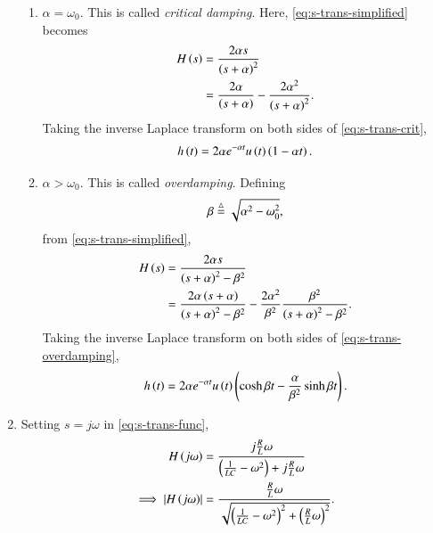 \documentclass[journal,12pt,twocolumn]{IEEEtran}
\begin{document}
\begin{enumerate}[label=\theenumi.]
\begin{enumerate}
        \item \(\alpha = \omega_0\). This is called \emph{critical damping}.
        Here, \eqref{eq:s-trans-simplified} becomes
        \begin{align}
            H\left(s\right) &= \frac{2\alpha{}s}{\left(s+\alpha\right)^2} \label{eq:H-s-crit} \\
                      &= \frac{2\alpha}{\left(s+\alpha\right)} - \frac{2\alpha^2}{\left(s+\alpha\right)^2}.
            \label{eq:s-trans-crit}
        \end{align}
        Taking the inverse Laplace transform on both sides of
        \eqref{eq:s-trans-crit},
        \begin{equation}
            h\left(t\right) = 2\alpha{}e^{-\alpha{}t}u\left(t\right)\left(1 - \alpha{}t\right).
            \label{eq:h-t-crit}
        \end{equation}

        \item \(\alpha > \omega_0\). This is called \emph{overdamping}. Defining
        \begin{equation}
            \beta \stackrel{\triangle}{=} \sqrt{\alpha^2 - \omega_0^2},
            \label{eq:beta-def}
        \end{equation}
        from \eqref{eq:s-trans-simplified},
        \begin{align}
            H\left(s\right) &= \frac{2\alpha{}s}{\left(s+\alpha\right)^2 - \beta^2} \label{eq:H-s-overdamping} \\
            &= \frac{2\alpha\left(s + \alpha\right)}{\left(s + \alpha\right)^2 - \beta^2} - \frac{2\alpha^2}{\beta^2}\frac{\beta^2}{\left(s+\alpha\right)^2 - \beta^2}.
            \label{eq:s-trans-overdamping}
        \end{align}
        Taking the inverse Laplace transform on both sides of
        \eqref{eq:s-trans-overdamping},
        \begin{equation}
            h\left(t\right) = 2\alpha{}e^{-\alpha{}t}u\left(t\right)\left(\cosh{\beta{}t} - \frac{\alpha}{\beta^2}\sinh{\beta{}t}\right).
            \label{eq:h-t-overdamping}
        \end{equation}
    \end{enumerate}

    \item Setting \(s = j\omega\) in \eqref{eq:s-trans-func},
    \begin{align}
        H\left(j\omega\right) &= \frac{j\frac{R}{L}\omega}{\left(\frac{1}{LC}-\omega^2\right) + j\frac{R}{L}\omega} \\
        \implies \left\vert H\left(j\omega\right)\right\vert &= \frac{\frac{R}{L}\omega}{\sqrt{\left(\frac{1}{LC}-\omega^2\right)^2 + \left(\frac{R}{L}\omega\right)^2}}.
        \label{eq:imp-resp-mag}
    \end{align}


\end{enumerate}
\end{document}

